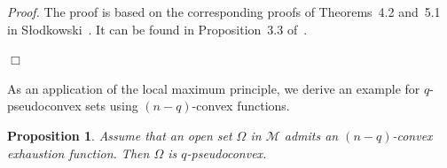 \documentclass[11pt,a4paper]{article}
\newtheorem{prop}[lem]{Proposition}
\newenvironment{proof}{\noindent\textit{Proof. }}{\hfill $\Box$\linebreak}
\newcommand{\Ccal}{\mathcal{C}}
\newcommand{\Mcal}{\mathcal{M}}
\begin{document}
\begin{proof} The proof is based on the corresponding proofs of Theorems~4.2 and~5.1 in S{\l}odkowski~\cite{Sl}. It can be found in Proposition~3.3 of~\cite{HST14}. 





\end{proof}


As an application of the local maximum principle, we derive an example for $q$-pseudoconvex sets using $(n-q)$-convex functions.

\begin{prop}\label{prop-q-cvx-psc} Assume that an open set $\Omega$ in $\Mcal$ admits an $(n-q)$-convex exhaustion function. Then $\Omega$ is $q$-pseudoconvex.
\end{prop}
\end{document}

